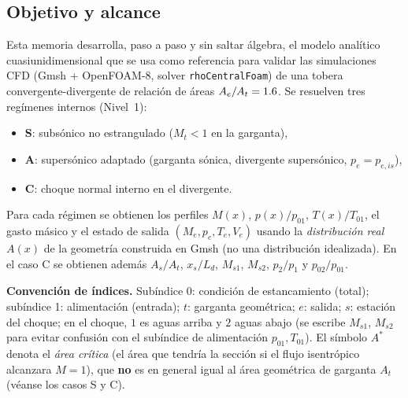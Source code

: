 \newcommand{\ptot}{p_0}\newcommand{\Ttot}{T_0}
\newcommand{\As}{A^{*}}
\newcommand{\dd}{\,\mathrm{d}}
\newcommand{\Msone}{M_{s1}}\newcommand{\Mstwo}{M_{s2}}
\newcommand{\ie}{es decir,\ }


\subsection{Objetivo y alcance}
Esta memoria desarrolla, paso a paso y sin saltar álgebra, el modelo analítico
cuasiunidimensional que se usa como referencia para validar las simulaciones CFD
(Gmsh + OpenFOAM-8, solver \texttt{rhoCentralFoam}) de una tobera convergente-divergente
de relación de áreas $A_e/A_t=1.6$. Se resuelven tres regímenes internos (Nivel~1):

\begin{itemize}[leftmargin=2em]
\item \textbf{S}: subsónico no estrangulado ($M_t<1$ en la garganta),
\item \textbf{A}: supersónico adaptado (garganta sónica, divergente supersónico, $p_e=p_{e,is}$),
\item \textbf{C}: choque normal interno en el divergente.
\end{itemize}

Para cada régimen se obtienen los perfiles $M(x)$, $p(x)/p_{01}$, $T(x)/T_{01}$, el gasto
másico y el estado de salida $(M_e,p_e,T_e,V_e)$ usando la \emph{distribución real} $A(x)$ de la
geometría construida en Gmsh (no una distribución idealizada). En el caso C se obtienen además
$A_s/A_t$, $x_s/L_d$, $M_{s1}$, $M_{s2}$, $p_2/p_1$ y $p_{02}/p_{01}$.

\textbf{Convención de índices.} Subíndice 0: condición de estancamiento (total); subíndice 1:
alimentación (entrada); $t$: garganta geométrica; $e$: salida; $s$: estación del choque; en el choque,
$1$ es aguas arriba y $2$ aguas abajo (se escribe $M_{s1}$, $M_{s2}$ para evitar confusión con el
subíndice de alimentación $p_{01},T_{01}$). El símbolo $A^{*}$ denota el \emph{área crítica}
(el área que tendría la sección si el flujo isentrópico alcanzara $M=1$), que \textbf{no} es
en general igual al área geométrica de garganta $A_t$ (véanse los casos S y C).

